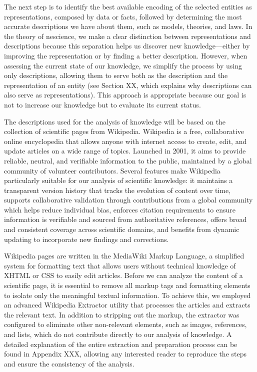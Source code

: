 The next step is to identify the best available encoding of the selected entities as representations, composed by data or facts, followed by determining the most accurate descriptions we have about them, such as models, theories, and laws. In the theory of nescience, we make a clear distinction between representations and descriptions because this separation helps us discover new knowledge—either by improving the representation or by finding a better description. However, when assessing the current state of our knowledge, we simplify the process by using only descriptions, allowing them to serve both as the description and the representation of an entity (see Section XX, which explains why descriptions can also serve as representations). This approach is appropriate because our goal is not to increase our knowledge but to evaluate its current status.

The descriptions used for the analysis of knowledge will be based on the collection of scientific pages from Wikipedia. Wikipedia is a free, collaborative online encyclopedia that allows anyone with internet access to create, edit, and update articles on a wide range of topics.  Launched in 2001, it aims to provide reliable, neutral, and verifiable information to the public, maintained by a global community of volunteer contributors. Several features make Wikipedia particularly suitable for our analysis of scientific knowledge: it maintains a transparent version history that tracks the evolution of content over time, supports collaborative validation through contributions from a global community which helps reduce individual bias, enforces citation requirements to ensure information is verifiable and sourced from authoritative references, offers broad and consistent coverage across scientific domains, and benefits from dynamic updating to incorporate new findings and corrections.

Wikipedia pages are written in the MediaWiki Markup Language, a simplified system for formatting text that allows users without technical knowledge of XHTML or CSS to easily edit articles. Before we can analyze the content of a scientific page, it is essential to remove all markup tags and formatting elements to isolate only the meaningful textual information. To achieve this, we employed an advanced Wikipedia Extractor utility that processes the articles and extracts the relevant text. In addition to stripping out the markup, the extractor was configured to eliminate other non-relevant elements, such as images, references, and lists, which do not contribute directly to our analysis of knowledge. A detailed explanation of the entire extraction and preparation process can be found in Appendix XXX, allowing any interested reader to reproduce the steps and ensure the consistency of the analysis.

